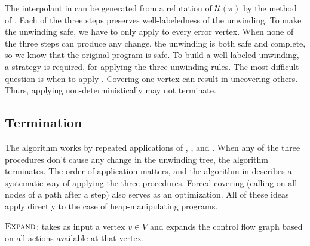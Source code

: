 The interpolant in  can be generated from a refutation of $\mathcal{U}(\pi)$ by the method of \cite{mcmillan05}. Each of the three steps preserves well-labeledness of the unwinding. To make the unwinding safe, we have to only apply  to every error vertex. When none of the three steps can produce any change, the unwinding is both safe and complete, so we know that the original program is safe.
To build a well-labeled unwinding, a strategy is required, for applying the three unwinding rules. The most difficult question is when to apply \cover. Covering one vertex can result in uncovering others. Thurs, applying \cover non-deterministically may not terminate.

\subsection{Termination}
The \impact algorithm works by repeated applications of \expand, \cover, and . When any of the three procedures don't cause any change in the unwinding tree, the algorithm terminates. The order of application matters, and the \unwind algorithm in \cite{mcmillan06} describes a systematic way of applying the three procedures. Forced covering (calling \cover on all nodes of a path after a  step) also serves as an optimization. All of these ideas apply directly to the case of heap-manipulating programs.

\begin{algorithm}[ht]


  \caption{$\textsc{Expand}$: takes as input a vertex $v \in V$ and expands the control flow graph based on all actions available at that vertex.}
  \label{alg:expand}
\end{algorithm}


